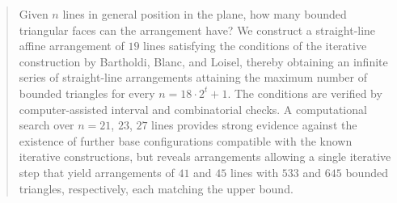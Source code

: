 \begin{abstract}
Given $n$ lines in general position in the plane, how many
bounded triangular faces can the arrangement have?
We construct a straight-line affine arrangement of $19$ lines
satisfying the conditions of the iterative construction by
Bartholdi, Blanc, and Loisel, thereby obtaining an infinite series
of straight-line arrangements attaining the maximum number of
bounded triangles for every $n=18\cdot 2^t+1$.
The conditions are verified by computer-assisted interval
and combinatorial checks.
A computational search over $n=21$, $23$, $27$ lines provides strong
evidence against the existence of further base configurations
compatible with the known iterative constructions, but reveals
arrangements allowing a single iterative step that yield arrangements
of $41$ and $45$ lines with $533$ and $645$ bounded triangles,
respectively, each matching the upper bound.
\end{abstract}
